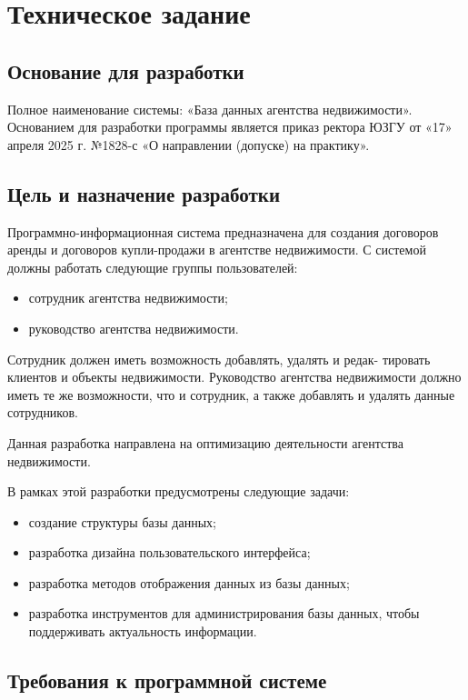 \section{Техническое задание}
\subsection{Основание для разработки}

Полное наименование системы: «База данных агентства недвижимости».
Основанием для разработки программы является приказ ректора ЮЗГУ
от «17» апреля 2025 г. №1828-с «О направлении (допуске) на практику».

\subsection{Цель и назначение разработки}

Программно-информационная система предназначена для создания договоров аренды и договоров купли-продажи в агентстве недвижимости. С системой должны работать следующие группы пользователей:
\begin{itemize}
\item	сотрудник агентства недвижимости;

\item руководство агентства недвижимости.
\end{itemize}
Сотрудник должен иметь возможность добавлять, удалять и редак- тировать клиентов и объекты недвижимости. Руководство агентства недвижимости должно иметь те же возможности, что и сотрудник, а также добавлять и удалять данные сотрудников.

Данная разработка направлена на оптимизацию деятельности агентства      недвижимости.

В рамках этой разработки предусмотрены следующие задачи:
\begin{itemize}
\item	создание структуры базы данных;

\item	разработка дизайна пользовательского интерфейса;

\item	разработка методов отображения данных из базы данных;

\item	разработка инструментов для администрирования базы данных, чтобы поддерживать актуальность информации.
\end{itemize}

\subsection{Требования к программной системе}

